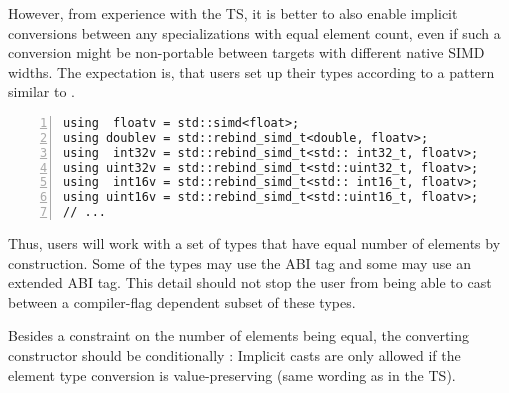 However, from experience with the TS, it is better to also enable implicit
conversions between any  specializations with equal element count,
even if such a conversion might be non-portable between targets with different
native SIMD widths.
The expectation is, that users set up their types according to a pattern
similar to .
\begin{lstlisting}[numbers=left,float={hbtp},label=lst:simdtypespattern,caption={
  Recommended setup of \code{simd} types
}]
using  floatv = std::simd<float>;
using doublev = std::rebind_simd_t<double, floatv>;
using  int32v = std::rebind_simd_t<std:: int32_t, floatv>;
using uint32v = std::rebind_simd_t<std::uint32_t, floatv>;
using  int16v = std::rebind_simd_t<std:: int16_t, floatv>;
using uint16v = std::rebind_simd_t<std::uint16_t, floatv>;
// ...
\end{lstlisting}
Thus, users will work with a set of types that have equal number of elements by
construction.
Some of the types may use the  ABI tag and some may use an
extended ABI tag.
This detail should not stop the user from being able to cast between a
compiler-flag dependent subset of these types.


Besides a constraint on the number of elements being equal, the converting
constructor should be conditionally :
Implicit casts are only allowed if the element type conversion is
value-preserving (same wording as in the TS).

